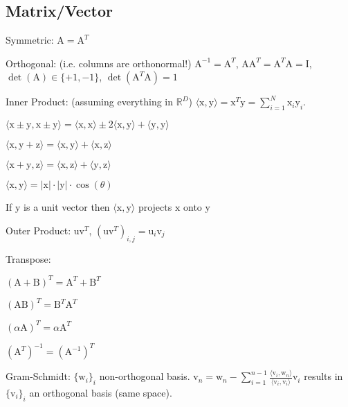 \documentclass[a4paper, 11pt, landscape]{article}
\newcommand{\matr}[1]{\boldsymbol{\mathrm{#1}}}
\begin{document}
\begin{multicols*}{3}
\section{Matrix/Vector}
\begin{compactdesc}
	\item[Symmetric:] $\matr{A} = \matr{A}^T$
	\item[Orthogonal:] (i.e. columns are orthonormal!) $\matr{A}^{-1} = \matr{A}^T$, $\matr{A} \matr{A}^T = \matr{A}^T \matr{A} = \matr{I}$, $\operatorname{det}(\matr{A}) \in \{+1, -1\}$, $\operatorname{det}(\matr{A}^T \matr{A}) = 1$
	\item[Inner Product:] (assuming everything in $\mathbb{R}^D$) $\langle \matr{x}, \matr{y} \rangle = \matr{x}^T \matr{y} = \sum_{i=1}^{N} \matr{x}_i \matr{y}_i$.
	\begin{compactitem}
		\item $\langle \matr{x} \pm \matr{y}, \matr{x} \pm \matr{y} \rangle = \langle \matr{x}, \matr{x} \rangle \pm 2 \langle \matr{x}, \matr{y} \rangle + \langle \matr{y}, \matr{y} \rangle$
		\begin{listcols}
			\item $\langle \matr{x}, \matr{y} + \matr{z} \rangle = \langle \matr{x}, \matr{y} \rangle + \langle \matr{x}, \matr{z} \rangle$
			\item $\langle \matr{x} + \matr{y}, \matr{z} \rangle = \langle \matr{x}, \matr{z} \rangle + \langle \matr{y}, \matr{z} \rangle$
			\item $\langle \matr{x}, \matr{y} \rangle = |\matr{x}| \cdot |\matr{y}| \cdot \cos(\theta)$
		\end{listcols}
		\item If $\matr{y}$ is a unit vector then $\langle \matr{x}, \matr{y} \rangle$ projects $\matr{x}$ onto $\matr{y}$
	\end{compactitem}
	\item[Outer Product:] $\matr{u} \matr{v}^T$, $(\matr{u} \matr{v}^T)_{i, j} = \matr{u}_i \matr{v}_j$
	\item[Transpose:]\hfill
	\begin{listcols}
		\begin{compactitem}
			\item $(\matr{A} + \matr{B})^T = \matr{A}^T + \matr{B}^T$
			\item $(\matr{A}\matr{B})^T = \matr{B}^T \matr{A}^T$
			\item $(\alpha \matr{A})^T = \alpha \matr{A}^T$
			\item $(\matr{A}^T)^{-1} = (\matr{A}^{-1})^T$
		\end{compactitem}
	\end{listcols}
	\item[Gram-Schmidt:] $\{\matr{w}_i\}_i$ non-orthogonal basis. $\matr{v}_n = \matr{w}_n - \sum_{i=1}^{n-1} \frac{\langle \matr{v}_i, \matr{w}_n \rangle}{\langle \matr{v}_i, \matr{v}_i \rangle} \matr{v}_i$ results in $\{\matr{v}_i\}_i$ an orthogonal basis (same space).
\end{compactdesc}


\end{multicols*}
\end{document}
